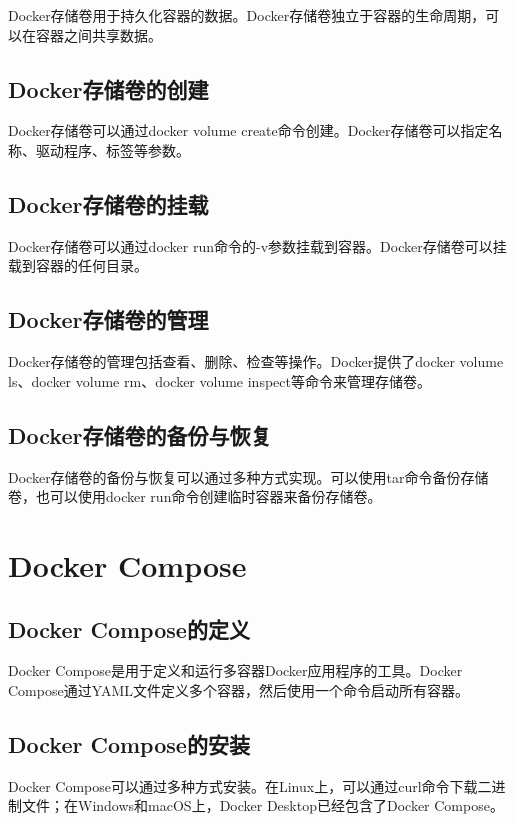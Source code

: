 \documentclass[12pt,UTF8]{ctexbook}
\begin{document}
Docker存储卷用于持久化容器的数据。Docker存储卷独立于容器的生命周期，可以在容器之间共享数据。

\section{Docker存储卷的创建}

Docker存储卷可以通过docker volume create命令创建。Docker存储卷可以指定名称、驱动程序、标签等参数。

\section{Docker存储卷的挂载}

Docker存储卷可以通过docker run命令的-v参数挂载到容器。Docker存储卷可以挂载到容器的任何目录。

\section{Docker存储卷的管理}

Docker存储卷的管理包括查看、删除、检查等操作。Docker提供了docker volume ls、docker volume rm、docker volume inspect等命令来管理存储卷。

\section{Docker存储卷的备份与恢复}

Docker存储卷的备份与恢复可以通过多种方式实现。可以使用tar命令备份存储卷，也可以使用docker run命令创建临时容器来备份存储卷。

\chapter{Docker Compose}

\section{Docker Compose的定义}

Docker Compose是用于定义和运行多容器Docker应用程序的工具。Docker Compose通过YAML文件定义多个容器，然后使用一个命令启动所有容器。

\section{Docker Compose的安装}

Docker Compose可以通过多种方式安装。在Linux上，可以通过curl命令下载二进制文件；在Windows和macOS上，Docker Desktop已经包含了Docker Compose。
\end{document}

